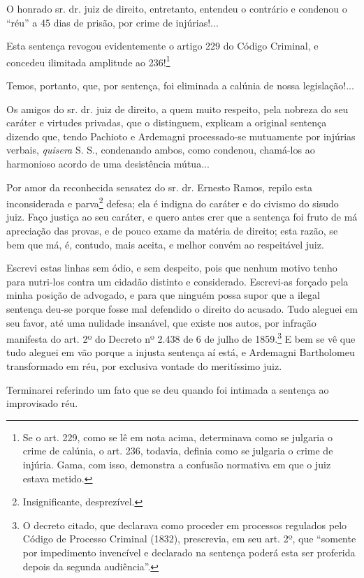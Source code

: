 {O honrado sr. dr. juiz de direito, entretanto, entendeu o contrário e
condenou o ``réu'' a 45 dias de prisão, por crime de injúrias!...

Esta sentença revogou evidentemente o artigo 229 do Código Criminal, e
concedeu ilimitada amplitude ao 236!\footnote{ Se o art. 229, como se
  lê em nota acima, determinava como se julgaria o crime de calúnia, o
  art. 236, todavia, definia como se julgaria o crime de injúria. Gama,
  com isso, demonstra a confusão normativa em que o juiz estava metido.}

Temos, portanto, que, por sentença, foi eliminada a calúnia de nossa
legislação!...

Os amigos do sr. dr. juiz de direito, a quem muito respeito, pela
nobreza do seu caráter e virtudes privadas, que o distinguem, explicam a
original sentença dizendo que, tendo Pachioto e Ardemagni processado-se
mutuamente por injúrias verbais, \emph{quisera} S. S., condenando ambos,
como condenou, chamá-los ao harmonioso acordo de uma desistência
mútua...

Por amor da reconhecida sensatez do sr. dr. Ernesto Ramos, repilo esta
inconsiderada e parva\footnote{ Insignificante, desprezível.} defesa;
ela é indigna do caráter e do civismo do sisudo juiz. Faço justiça ao
seu caráter, e quero antes crer que a sentença foi fruto de má
apreciação das provas, e de pouco exame da matéria de direito; esta
razão, se bem que má, é, contudo, mais aceita, e melhor convém ao
respeitável juiz.

Escrevi estas linhas sem ódio, e sem despeito, pois que nenhum motivo
tenho para nutri-los contra um cidadão distinto e considerado.
Escrevi-as forçado pela minha posição de advogado, e para que ninguém
possa supor que a ilegal sentença deu-se porque fosse mal defendido o
direito do acusado. Tudo aleguei em seu favor, até uma nulidade
insanável, que existe nos autos, por infração manifesta do art. 2º do
Decreto nº 2.438 de 6 de julho de 1859.\footnote{ O decreto citado, que
  declarava como proceder em processos regulados pelo Código de Processo
  Criminal (1832), prescrevia, em seu art. 2º, que ``somente por
  impedimento invencível e declarado na sentença poderá esta ser
  proferida depois da segunda audiência''.} E bem se vê que tudo aleguei
em vão porque a injusta sentença aí está, e Ardemagni Bartholomeu
transformado em réu, por exclusiva vontade do meritíssimo juiz.

Terminarei referindo um fato que se deu quando foi intimada a sentença
ao improvisado réu.

}
